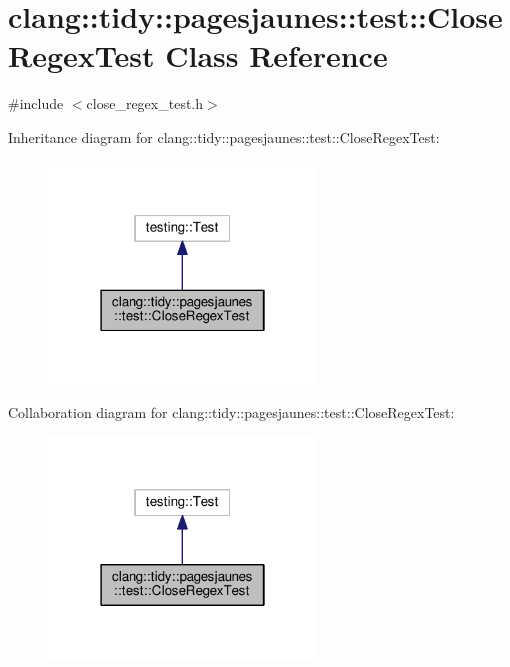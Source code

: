 \hypertarget{classclang_1_1tidy_1_1pagesjaunes_1_1test_1_1_close_regex_test}{}\section{clang\+:\+:tidy\+:\+:pagesjaunes\+:\+:test\+:\+:Close\+Regex\+Test Class Reference}
\label{classclang_1_1tidy_1_1pagesjaunes_1_1test_1_1_close_regex_test}


{\ttfamily \#include $<$close\+\_\+regex\+\_\+test.\+h$>$}



Inheritance diagram for clang\+:\+:tidy\+:\+:pagesjaunes\+:\+:test\+:\+:Close\+Regex\+Test\+:
\nopagebreak
\begin{figure}[H]
\begin{center}
\leavevmode
\includegraphics[width=202pt]{classclang_1_1tidy_1_1pagesjaunes_1_1test_1_1_close_regex_test__inherit__graph}
\end{center}
\end{figure}


Collaboration diagram for clang\+:\+:tidy\+:\+:pagesjaunes\+:\+:test\+:\+:Close\+Regex\+Test\+:
\nopagebreak
\begin{figure}[H]
\begin{center}
\leavevmode
\includegraphics[width=202pt]{classclang_1_1tidy_1_1pagesjaunes_1_1test_1_1_close_regex_test__coll__graph}
\end{center}
\end{figure}
